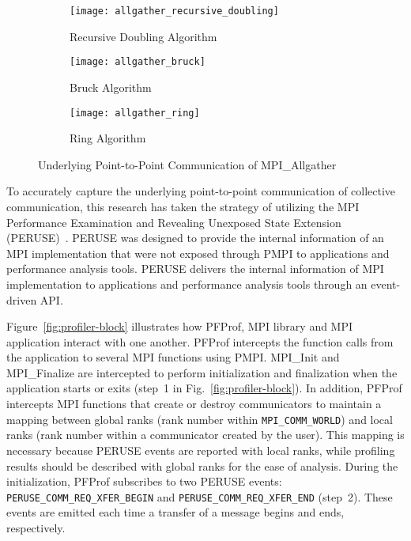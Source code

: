 \begin{figure}
    \centering
    \begin{subfigure}{\linewidth}
        \centering
        \texttt{[image: allgather\_recursive\_doubling]}
        \caption{Recursive Doubling Algorithm}%
        \label{fig:allgather-recursive}
    \end{subfigure}
    \begin{subfigure}{\linewidth}
        \centering
        \texttt{[image: allgather\_bruck]}
        \caption{Bruck Algorithm}%
        \label{fig:allgather-bruck}
    \end{subfigure}
    \begin{subfigure}{\linewidth}
        \centering
        \texttt{[image: allgather\_ring]}
        \caption{Ring Algorithm}%
        \label{fig:allgather-ring}
    \end{subfigure}
    \caption{Underlying Point-to-Point Communication of MPI\_Allgather}%
    \label{fig:allgather-algorithms}
\end{figure}

To accurately capture the underlying point-to-point communication of
collective communication, this research has taken the strategy of utilizing
the MPI Performance Examination and Revealing Unexposed State Extension
(PERUSE)~\autocite{Jones2006}. PERUSE was designed to provide the internal
information of an MPI implementation that were not exposed through PMPI to
applications and performance analysis tools. PERUSE delivers the internal
information of MPI implementation to applications and performance analysis
tools through an event-driven API\@.

Figure~\ref{fig:profiler-block} illustrates how PFProf, MPI library and MPI
application interact with one another. PFProf intercepts the function calls
from the application to several MPI functions using PMPI\@. MPI\_Init and
MPI\_Finalize are intercepted to perform initialization and finalization when
the application starts or exits (step~1 in Fig.~\ref{fig:profiler-block}). In
addition, PFProf intercepts MPI functions that create or destroy communicators
to maintain a mapping between global ranks (rank number within
\lstinline!MPI_COMM_WORLD!) and local ranks (rank number within a communicator
created by the user). This mapping is necessary because PERUSE events are
reported with local ranks, while profiling results should be described with
global ranks for the ease of analysis. During the initialization, PFProf
subscribes to two PERUSE events: \lstinline!PERUSE_COMM_REQ_XFER_BEGIN! and
\lstinline!PERUSE_COMM_REQ_XFER_END! (step~2). These events are emitted each
time a transfer of a message begins and ends, respectively.

